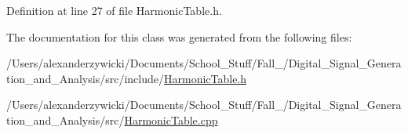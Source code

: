 Definition at line 27 of file Harmonic\+Table.\+h.



The documentation for this class was generated from the following files\+:\begin{DoxyCompactItemize}
\item 
/\+Users/alexanderzywicki/\+Documents/\+School\+\_\+\+Stuff/\+Fall\+\_/\+Digital\+\_\+\+Signal\+\_\+\+Generation\+\_\+and\+\_\+\+Analysis/src/include/\hyperlink{HarmonicTable_8h}{Harmonic\+Table.\+h}\item 
/\+Users/alexanderzywicki/\+Documents/\+School\+\_\+\+Stuff/\+Fall\+\_/\+Digital\+\_\+\+Signal\+\_\+\+Generation\+\_\+and\+\_\+\+Analysis/src/\hyperlink{HarmonicTable_8cpp}{Harmonic\+Table.\+cpp}\end{DoxyCompactItemize}
